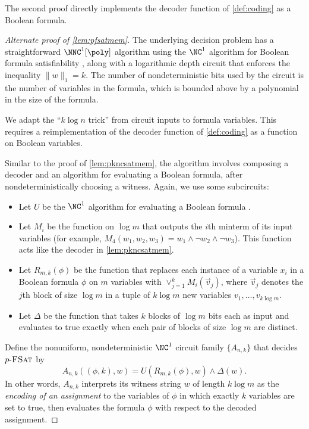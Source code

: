 The second proof directly implements the decoder function of \autoref{def:coding} as a Boolean formula.

\begin{proof}[Alternate proof of \autoref{lem:pfsatmem}]
  The underlying decision problem has a straightforward $\NNC^1[\poly]$ algorithm using the $\NC^1$ algorithm for Boolean formula satisfiability \autocites{buss87, bcgr92}, along with a logarithmic depth circuit that enforces the inequality $\|w\|_1 = k$.
  The number of nondeterministic bits used by the circuit is the number of variables in the formula, which is bounded above by a polynomial in the size of the formula.

  We adapt the ``$k \log n$ trick'' from circuit inputs to formula variables.
  This requires a reimplementation of the decoder function of \autoref{def:coding} as a function on Boolean variables.

  Similar to the proof of \autoref{lem:pkncsatmem}, the algorithm involves composing a decoder and an algorithm for evaluating a Boolean formula, after nondeterministically choosing a witness.
  Again, we use some subcircuits:
  \begin{itemize}
  \item Let $U$ be the $\NC^1$ algorithm for evaluating a Boolean formula \autocites{buss87, bcgr92}.
  \item
    Let $M_i$ be the function on $\log m$ that outputs the $i$th minterm of its input variables (for example, $M_4(w_1, w_2, w_3) = w_1 \land \lnot w_2 \land \lnot w_3$).
    This function acts like the decoder in \autoref{lem:pkncsatmem}.
  \item
    Let $R_{m, k}(\phi)$ be the function that replaces each instance of a variable $x_i$ in a Boolean formula $\phi$ on $m$ variables with $\vee_{j = 1}^k M_i(\vec{v}_j)$, where $\vec{v}_j$ denotes the $j$th block of size $\log m$ in a tuple of $k \log m$ new variables $v_1, \dotsc, v_{k \log m}$.
  \item Let $\Delta$ be the function that takes $k$ blocks of $\log m$ bits each as input and evaluates to true exactly when each pair of blocks of size $\log m$ are distinct.
  \end{itemize}
  Define the nonuniform, nondeterministic $\NC^1$ circuit family $\{A_{n, k}\}$ that decides $p \textnormal{-} \textsc{FSat}$ by
  \[
  A_{n, k}((\phi, k), w) = U(R_{m, k}(\phi), w) \land \Delta(w).
  \]
  In other words, $A_{n, k}$ interprets its witness string $w$ of length $k \log m$ as the \emph{encoding of an assignment} to the variables of $\phi$ in which exactly $k$ variables are set to true, then evaluates the formula $\phi$ with respect to the decoded assignment.


\end{proof}
